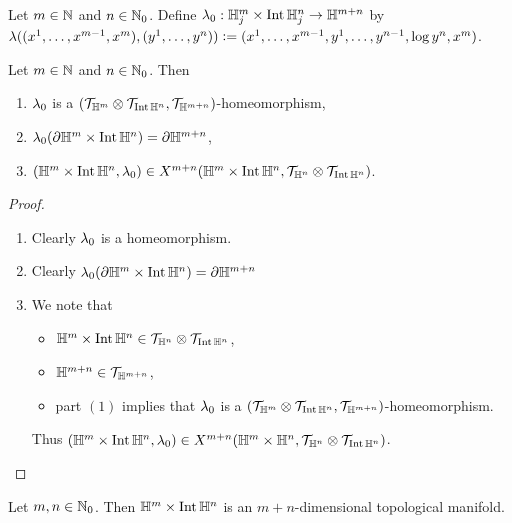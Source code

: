 \documentclass{book}
\begin{document}
\begin{defn} 
	Let $m \in \mathbb{N}$ and $n \in \mathbb{N}_0$. Define $\lambda_0: \mathbb{H}^m_j \times \operatorname{Int} \mathbb{H}^n_j \rightarrow \mathbb{H}^{m+n}$ by $\lambda((x^1, \ldots, x^{m-1}, x^m), (y^1, \ldots, y^n)) \vcentcolon= (x^1, \ldots, x^{m-1}, y^1, \ldots, y^{n-1}, \log y^n, x^m)$.  
\end{defn}

\begin{ex} 
	Let $m \in \mathbb{N}$ and $n \in \mathbb{N}_0$. Then 
	\begin{enumerate}
		\item $\lambda_0$ is a $(\mathcal{T}_{\mathbb{H}^m} \otimes \mathcal{T}_{\operatorname{Int} \mathbb{H}^n}, \mathcal{T}_{\mathbb{H}^{m+n}})$-homeomorphism,
		\item $\lambda_0(\partial \mathbb{H}^m \times \operatorname{Int} \mathbb{H}^n) = \partial \mathbb{H}^{m+n}$,
		\item $(\mathbb{H}^m \times \operatorname{Int} \mathbb{H}^n, \lambda_0) \in X^{m+n}(\mathbb{H}^m \times \operatorname{Int} \mathbb{H}^n, \mathcal{T}_{\mathbb{H}^n} \otimes \mathcal{T}_{\operatorname{Int} \mathbb{H}^n})$.
	\end{enumerate}
\end{ex}

\begin{proof}\
	\begin{enumerate}
		\item Clearly $\lambda_0$ is a homeomorphism.
		\item Clearly $\lambda_0(\partial \mathbb{H}^m \times \operatorname{Int} \mathbb{H}^n) = \partial \mathbb{H}^{m+n}$
		\item We note that
		\begin{itemize}
			\item $\mathbb{H}^m \times \operatorname{Int} \mathbb{H}^n \in \mathcal{T}_{\mathbb{H}^n} \otimes \mathcal{T}_{\operatorname{Int} \mathbb{H}^n}$,
			\item $\mathbb{H}^{m+n} \in \mathcal{T}_{\mathbb{H}^{m+n}}$,
			\item part $(1)$ implies that $\lambda_0$ is a $(\mathcal{T}_{\mathbb{H}^m} \otimes \mathcal{T}_{\operatorname{Int} \mathbb{H}^n}, \mathcal{T}_{\mathbb{H}^{m+n}})$-homeomorphism.
		\end{itemize}
		Thus $(\mathbb{H}^m \times \operatorname{Int} \mathbb{H}^n, \lambda_0) \in X^{m+n}(\mathbb{H}^m \times \mathbb{H}^n, \mathcal{T}_{\mathbb{H}^n} \otimes \mathcal{T}_{\operatorname{Int} \mathbb{H}^n})$.
	\end{enumerate}
\end{proof}

\begin{ex} 
	Let $m, n \in \mathbb{N}_0$. Then $\mathbb{H}^m \times \operatorname{Int} \mathbb{H}^n$ is an $m+n$-dimensional topological manifold.
\end{ex}
\end{document}
